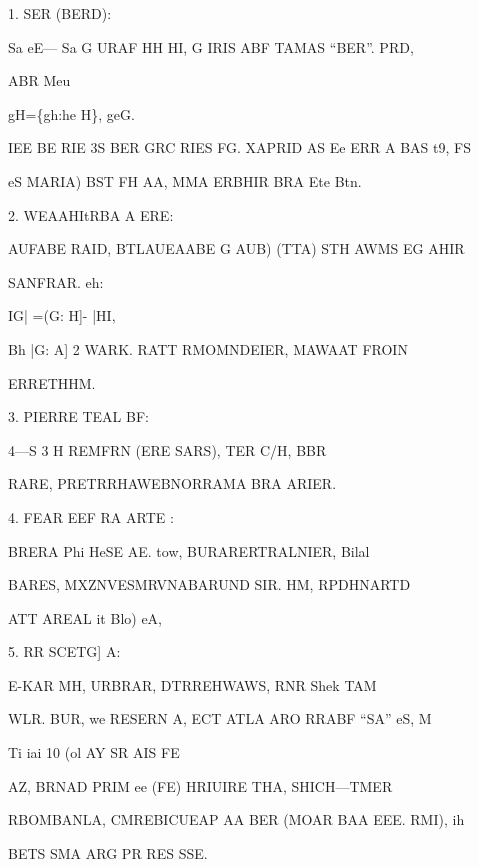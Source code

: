 \begin{note}[陪集的意义]

1. SER (BERD):

Sa eE— Sa G URAF HH HI, G IRIS ABF TAMAS “BER”. PRD,

ABR Meu

gH=\{gh:he H\}, geG.

IEE BE RIE 3S BER GRC RIES FG. XAPRID AS Ee ERR A BAS t9, FS

eS MARIA) BST FH AA, MMA ERBHIR BRA Ete Btn.

2. WEAAHItRBA A ERE:

AUFABE RAID, BTLAUEAABE G AUB) (TTA) STH AWMS EG AHIR

SANFRAR. eh:

IG| =(G: H]- |HI,

Bh |G: A] 2 WARK. RATT RMOMNDEIER, MAWAAT FROIN

ERRETHHM.

3. PIERRE TEAL BF:

4—S 3 H REMFRN (ERE SARS), TER C/H, BBR

RARE, PRETRRHAWEBNORRAMA BRA ARIER.

4. FEAR EEF RA ARTE :

BRERA Phi HeSE AE. tow, BURARERTRALNIER, Bilal

BARES, MXZNVESMRVNABARUND SIR. HM, RPDHNARTD

ATT AREAL it Blo) eA,

5. RR SCETG] A:

E-KAR MH, URBRAR, DTRREHWAWS, RNR Shek TAM

WLR. BUR, we RESERN A, ECT ATLA ARO RRABF “SA” eS, M

Ti iai 10 (ol AY SR AIS FE

AZ, BRNAD PRIM ee (FE) HRIUIRE THA, SHICH—TMER

RBOMBANLA, CMREBICUEAP AA BER (MOAR BAA EEE. RMI), ih

BETS SMA ARG PR RES SSE.

\end{note}

